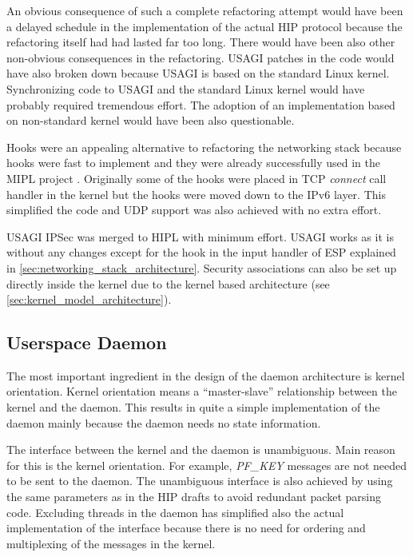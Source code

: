 An obvious consequence of such a complete refactoring attempt would
have been a delayed schedule in the implementation of the actual HIP
protocol because the refactoring itself had had lasted far too
long. There would have been also other non-obvious consequences in the
refactoring. USAGI patches in the code would have also broken down
because USAGI is based on the standard Linux kernel. Synchronizing
code to USAGI and the standard Linux kernel would have probably
required tremendous effort. The adoption of an implementation based on
non-standard kernel would have been also questionable.

Hooks were an appealing alternative to refactoring the networking
stack because hooks were fast to implement and they were already
successfully used in the MIPL project \cite{mipl}. Originally some of
the hooks were placed in TCP \textit{connect} call handler in the
kernel but the hooks were moved down to the IPv6 layer. This
simplified the code and UDP support was also achieved with no extra
effort.

USAGI IPSec was merged to HIPL with minimum effort. USAGI works as it
is without any changes except for the hook in the input handler of ESP
explained in \autoref{sec:networking_stack_architecture}. Security
associations can also be set up directly inside the kernel due to the
kernel based architecture (see
\autoref{sec:kernel_model_architecture}).

\subsection{Userspace Daemon}
\label{sec:userspace_daemon_lessons}

The most important ingredient in the design of the daemon architecture
is kernel orientation. Kernel orientation means a ``master-slave''
relationship between the kernel and the daemon. This results in quite
a simple implementation of the daemon mainly because the daemon needs
no state information.

The interface between the kernel and the daemon is unambiguous. Main
reason for this is the kernel orientation. For example,
\textit{PF\_KEY} \cite{rfc2367} messages are not needed to be sent to
the daemon. The unambiguous interface is also achieved by using the
same parameters as in the HIP drafts to avoid redundant packet parsing
code. Excluding threads in the daemon has simplified also the actual
implementation of the interface because there is no need for ordering
and multiplexing of the messages in the kernel.

